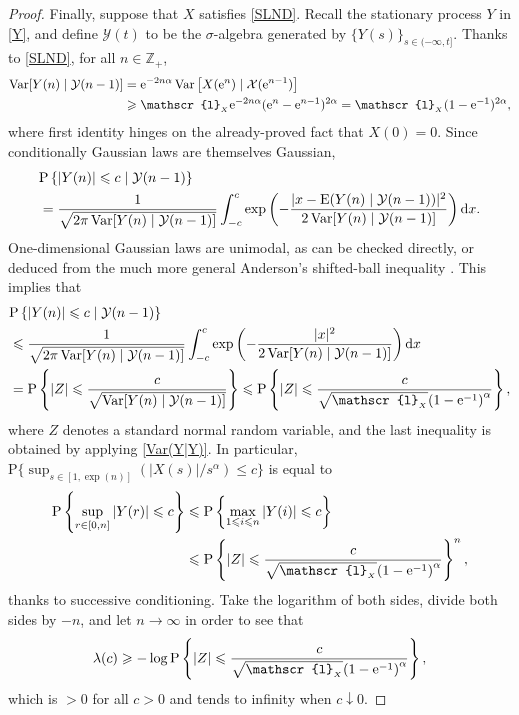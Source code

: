 \documentclass[reqno]{amsart}
\DeclareMathOperator{\Var}{Var}
\newcommand{\<}{\langle}
\renewcommand{\>}{\rangle}
\newcommand{\Z}{\mathbb{Z}}
\renewcommand{\P}{\mathrm{P}}
\newcommand{\E}{\mathrm{E}}
\newcommand{\1}{\mathbb{1}}
\renewcommand{\d}{{\rm d}}
\newcommand{\e}{{\rm e}}
\renewcommand{\ge}{\geqslant}
\renewcommand{\le}{\leqslant}
\theoremstyle{definition}
\numberwithin{equation}{section}
\begin{document}
\begin{proof}
	Finally, suppose that $X$ satisfies \eqref{SLND}. Recall the stationary process $Y$
	in \eqref{Y}, and  define $\mathcal{Y}(t)$ to be the $\sigma$-algebra generated
	by $\{Y(s)\}_{s\in(-\infty,t]}$. Thanks to \eqref{SLND},
	for all $n\in\Z_+$,
	\begin{align}\begin{split}\label{Var(Y|Y)}
		\Var[Y(n)\mid \mathcal{Y}(n-1)] 
		&= \e^{-2n\alpha}
		\Var\left[ X(\e^{n})\mid \mathcal{X}(\e^{n-1})\right]\\
		&\ge \mathscr{l}_{_X}\e^{-2n\alpha}(\e^{n}-\e^{n-1})^{2\alpha}
		= \mathscr{l}_{_X}(1-\e^{-1})^{2\alpha},
	\end{split}\end{align}
	where first identity hinges on the already-proved fact that $X(0)=0$.
	Since conditionally Gaussian laws are themselves Gaussian,
	\begin{align*}
		&\P\left\{ |Y(n)|\le c\mid\mathcal{Y}(n-1)\right\}\\
		&= \frac{1}{\sqrt{2\pi \Var[Y(n)\mid \mathcal{Y}(n-1)]}}
			\int_{- c }^ c  \exp\left( 
			-\frac{|x-\E(Y(n)\mid\mathcal{Y}(n-1))|^2}{2
			\Var[Y(n)\mid \mathcal{Y}(n-1)]}\right)\d x.
	\end{align*}
	One-dimensional Gaussian laws are unimodal, as can be checked
	directly, or deduced from the much more general 
	Anderson's shifted-ball inequality \cite{Anderson55}.
	This implies that
	\begin{align*}
		&\P\left\{ |Y(n)|\le c\mid\mathcal{Y}(n-1)\right\}\\
		&\le \frac{1}{\sqrt{2\pi \Var[Y(n)\mid \mathcal{Y}(n-1)]}}
			\int_{- c }^ c  \exp\left( 
			-\frac{|x|^2}{2
			\Var[Y(n)\mid \mathcal{Y}(n-1)]}\right)\d x\\
		&=\P\left\{ |Z| \le \frac{c}{\sqrt{\Var[Y(n)\mid \mathcal{Y}(n-1)]}} \right\}
		\le \P\left\{|Z| \le \frac{c}{\sqrt{\mathscr{l}_{_X}}{(1-\e^{-1})}^{\alpha}}\right\},
	\end{align*}
	where $Z$ denotes a standard normal random variable, and the 
	last inequality is obtained by applying \eqref{Var(Y|Y)}.
	In particular, $\P\{\sup_{s\in[1,\exp(n)]} \left( |X(s)|/s^\alpha\right) \le c\}$
	is equal to
	\begin{align}\begin{split}\label{X:bc:UB}
		\P\left\{ \sup_{r\in[0,n]}|Y(r)|\le c\right\}
		&\le \P\left\{ \max_{1\le i\le n}|Y(i)| \le c\right\}\\
		&\le \P\left\{|Z| \le 
		\frac{c}{\sqrt{\mathscr{l}_{_X}}{(1-\e^{-1})}^{\alpha}}\right\}^n,
	\end{split}\end{align}
	thanks to successive conditioning. 
	Take the logarithm of both sides, divide both
	sides by $-n$, and let $n\to\infty$ in order to see that
	\begin{equation}\label{lambda:LB}
		\lambda(c) \ge -\log\P\left\{|Z| \le 
			\frac{c}{\sqrt{\mathscr{l}_{_X}}{(1-\e^{-1})}^{\alpha}}\right\},
	\end{equation}
	which is $>0$ for all $c>0$
	and tends to infinity when $c\downarrow0$. 
	

\end{proof}
\end{document}

